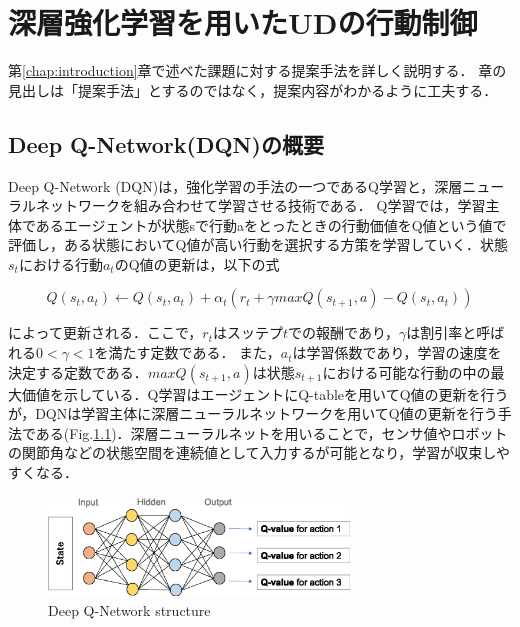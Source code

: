 \documentclass[12pt]{sonota/aislab}
\begin{document}
\chapter{深層強化学習を用いたUDの行動制御}\label{chap:proposal}
第\ref{chap:introduction}章で述べた課題に対する提案手法を詳しく説明する．
章の見出しは「提案手法」とするのではなく，提案内容がわかるように工夫する．

\section{Deep Q-Network(DQN)の概要}
Deep Q-Network (DQN)は，強化学習の手法の一つであるQ学習と，深層ニューラルネットワークを組み合わせて学習させる技術である\cite{drl}． Q学習では，学習主体であるエージェントが状態sで行動aをとったときの行動価値をQ値という値で評価し，ある状態においてQ値が高い行動を選択する方策を学習していく．状態$s_{t}$における行動$a_{t}$のQ値の更新は，以下の式

\begin{equation}
\label{q_update}
Q(s_{t},a_{t} )←Q(s_{t},a_{t} )+ α_{t} (r_{t}+ \gamma maxQ(s_{t+1},a)-Q(s_{t},a_{t}))
\end{equation}

によって更新される．ここで，$r_{t}$はスッテプ$t$での報酬であり，$\gamma$は割引率と呼ばれる$ 0 < \gamma <1 $を満たす定数である．
また，$a_{t}$は学習係数であり，学習の速度を決定する定数である．$maxQ(s_{t+1},a)$は状態$s_{t+1}$における可能な行動の中の最大価値を示している．Q学習はエージェントにQ-tableを用いてQ値の更新を行うが，DQNは学習主体に深層ニューラルネットワークを用いてQ値の更新を行う手法である(Fig.\ref{DQN})．深層ニューラルネットを用いることで，センサ値やロボットの関節角などの状態空間を連続値として入力するが可能となり，学習が収束しやすくなる．


\begin{figure}[t]
\begin{center}
\includegraphics[clip, width=8cm]{figs/dqn_network.eps}
\caption{Deep Q-Network structure}
\label{DQN}
\end{center}
\end{figure}
\end{document}
